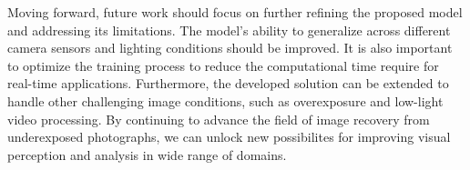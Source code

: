 \documentclass{article}
\begin{document}
Moving forward, future work should focus on further refining the proposed model and addressing its limitations. The model's ability to generalize across different camera sensors and lighting conditions should be improved. It is also important to optimize the training process to reduce the computational time require for real-time applications. Furthermore, the developed solution can be extended to handle other challenging image conditions, such as overexposure and low-light video processing. By continuing to advance the field of image recovery from underexposed photographs, we can unlock new possibilites for improving visual perception and analysis in wide range of domains.

\medskip
\printbibliography %
\end{document}
